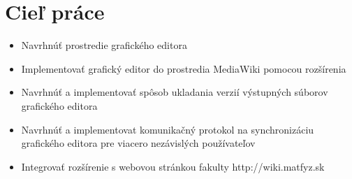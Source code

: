 \newpage
\section{Cieľ práce}
\begin{itemize}
	\item Navrhnúť prostredie grafického editora
	\item Implementovať grafický editor do prostredia MediaWiki pomocou rozšírenia
	\item Navrhnúť a implementovať spôsob ukladania verzií výstupných súborov grafického editora
	\item Navrhnúť a implementovat komunikačný protokol na synchronizáciu grafického editora pre viacero nezávislých používateľov
	\item Integrovať rozšírenie s webovou stránkou fakulty http://wiki.matfyz.sk
\end{itemize}